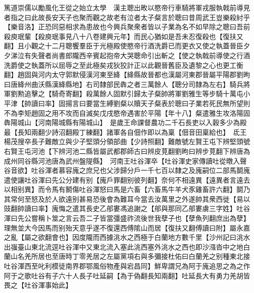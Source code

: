 篤道崇儒以勵風化王從之始立太學　漢主聰出畋以愍帝行車騎將軍戎服執戟前導見者指之曰此故長安天子也聚而觀之故老有泣者太子粲言於聰曰昔周武王豈樂殺紂乎【樂音洛】正恐同惡相求為患故也今興兵聚衆者皆以子業為名不如早除之聰曰吾前殺庾珉輩【殺庾珉事見八十八卷建興元年】而民心猶如是吾未忍復殺也【復扶又翻】且小觀之十二月聰饗羣臣于光極殿使愍帝行酒洗爵已而更衣又使之執蓋晉臣夕夕涕泣有失聲者尚書郎隴西辛賓起抱帝大哭聰命引出斬之【使之執戟前導使之行酒洗爵使之執蓋所以屈辱之至此極矣戎狄狡計正以此觀晉舊臣及遺黎之心也更工衡翻】趙固與河内太守郭默侵漢河東至絳【絳縣故晉都也漢屬河東郡晉屬平陽郡劉昫曰唐絳州曲沃縣漢絳縣地】右司隸部民犇之者三萬餘人【聰分司隸為左右】騎兵將軍劉勲追擊之【騎奇寄翻】殺萬餘人固默引歸太子粲帥將軍劉雅生等步騎十萬屯小平津【帥讀曰率】固揚言曰要當生縛劉粲以贖天子粲表於聰曰子業若死民無所望則不為李矩趙固之用不攻而自滅矣戊戌愍帝遇害於平陽【年十八】粲遣雅生攻洛陽固犇陽城山【河南陽城縣有陽城山】　是歲王命課督農功二千石長吏以入穀多少為殿最【長知兩翻少詩沼翻殿丁練翻】諸軍各自佃作即以為稟【佃音田稟給也】　氐王楊茂搜卒長子難敵立與少子堅頭分領部曲【少詩照翻】難敵號左賢王屯下辨堅頭號右賢王屯河池【下辨河池二縣皆屬武都郡師古曰辨皮莧翻劉昫曰辨步莧翻下辨唐為成州同谷縣河池唐為武州盤隄縣】　河南王吐谷渾卒【吐谷渾史家傳讀吐從暾入聲谷音欲】吐谷渾者慕容廆之庶兄也父涉歸分戶一千七百以隸之及廆嗣位二部馬鬬廆遣使讓吐谷渾曰先公分建有别【廆戶罪翻别彼列翻】奈何不相遠異【遠異者言遠去以相别異】而令馬有鬭傷吐谷渾怒曰馬是六畜【六畜馬牛羊犬豕雞畜許六翻】鬬乃其常何至怒及於人欲遠别甚易恐後會為難耳今當去汝萬里之外遂帥其衆西徙【易以豉翻帥讀曰率】廆悔之遣其長史乙郍婁馮追謝之【郍與那同乙郍婁虜三字姓】吐谷渾曰先公嘗稱卜筮之言云吾二子皆當彊盛祚流後世我孽子也【孽魚列翻庶出為孽】理無並大今因馬而别殆天意乎遂不復還西傅隂山而居【復扶又翻傅讀曰附】屬永嘉之亂【屬之欲翻會也】因度隴而西據洮水之西極于白蘭地方數千里【沙州記曰洮水出嵹臺山東北流逕吐谷渾中又東北流入塞此洮西塞外洮水之西也即沙漒沓中之地白蘭山名羌所居也至唐時丁零羌居之左屬黨項右與多彌接杜佑曰白蘭羌之别種東北接吐谷渾西至叱利模徒南界郡鄂風俗物產與宕昌同】鮮卑謂兄為阿于廆追思之為之作阿于之歌吐谷有子六十人長子吐延嗣【為于偽翻長知兩翻】吐延長大有勇力羌胡皆畏之【吐谷渾事始此】

